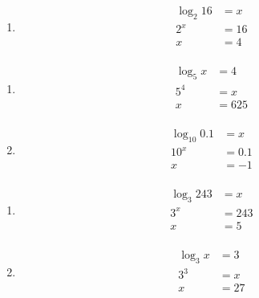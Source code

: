 \documentclass{exam}
\begin{document}
\begin{description}
\begin{enumerate}[a]
        \item 
          \begin{align*}
            \log_2 16 &= x \\
            2^x       &= 16 \\
            x         &= \boxed{4} \\
          \end{align*}
      \end{enumerate}

    \item[26]
      \begin{enumerate}[a]
        \item 
          \begin{align*}
            \log_5 x &= 4 \\
            5^4      &= x \\
            x        &= \boxed{625} \\
          \end{align*}

        \item 
          \begin{align*}
            \log_{10} 0.1 &= x \\
            10^x          &= 0.1 \\
            x             &= \boxed{-1} \\
          \end{align*}
      \end{enumerate}

    \item[27]
      \begin{enumerate}[a]
        \item 
          \begin{align*}
            \log_3 243 &= x \\
            3^x        &= 243 \\
            x          &= \boxed{5} \\
          \end{align*}

        \item 
          \begin{align*}
            \log_3 x &= 3 \\
            3^3      &= x \\
            x        &= \boxed{27} \\
          \end{align*}
      \end{enumerate}


\end{description}
\end{document}
